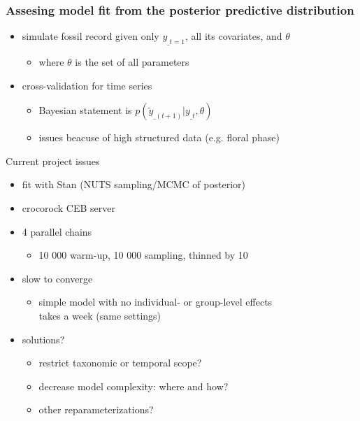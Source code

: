 \documentclass{beamer}
\begin{document}
\begin{frame}
  \frametitle{Assesing model fit from the posterior predictive distribution}
  \begin{itemize}
    \item simulate fossil record given only \(y_{\_t = 1}\), all its covariates, and \(\theta\)
      \begin{itemize}
        \item where \(\theta\) is the set of all parameters
      \end{itemize}
    \item cross-validation for time series
      \begin{itemize}
        \item Bayesian statement is \(p(\tilde{y}_{\_(t + 1)} | y_{\_t}, \theta)\)
        \item issues beacuse of high structured data (e.g. floral phase)
      \end{itemize}
  \end{itemize}
\end{frame}

\begin{frame}
  \begin{alertblock}{Current project issues}
    \begin{itemize}
      \item fit with Stan (NUTS sampling/MCMC of posterior)
      \item crocorock CEB server
      \item 4 parallel chains
        \begin{itemize}
          \item 10 000 warm-up, 10 000 sampling, thinned by 10
        \end{itemize}
      \item slow to converge 
        \begin{itemize}
          \item simple model with no individual- or group-level effects \\takes a week (same settings)
        \end{itemize}
      \item solutions?
        \begin{itemize}
          \item restrict taxonomic or temporal scope?
          \item decrease model complexity: where and how?
          \item other reparameterizations?
        \end{itemize}
    \end{itemize}
  \end{alertblock}
\end{frame}
\end{document}
